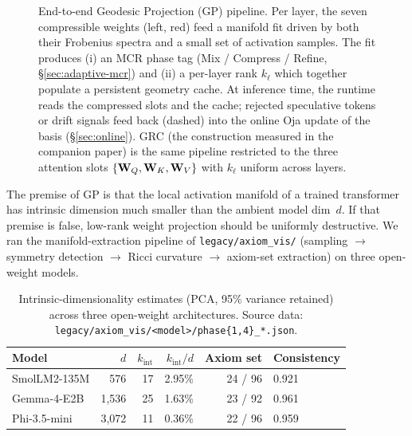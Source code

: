 \documentclass[11pt]{article}
\begin{document}
\begin{figure}[h]
\caption{End-to-end Geodesic Projection (GP) pipeline.  Per layer, the
seven compressible weights (left, red) feed a manifold fit driven by
both their Frobenius spectra and a small set of activation samples.  The
fit produces (i) an MCR phase tag (Mix / Compress / Refine,
\S\ref{sec:adaptive-mcr}) and (ii) a per-layer rank $k_\ell$ which together
populate a persistent geometry cache.  At inference time, the runtime
reads the compressed slots and the cache; rejected speculative tokens or
drift signals feed back (dashed) into the online Oja update of the basis
(\S\ref{sec:online}).  GRC (the construction measured in the companion paper)
is the same pipeline restricted to the three attention slots
$\{\mathbf{W}_Q,\mathbf{W}_K,\mathbf{W}_V\}$ with $k_\ell$ uniform across layers.}
\label{fig:gp-pipeline}
\end{figure}

\noindent The premise of GP is that the local activation manifold of a trained
transformer has intrinsic dimension much smaller than the ambient model
dim~$d$.  If that premise is false, low-rank weight projection should be
uniformly destructive.  We ran the manifold-extraction pipeline of
\texttt{legacy/axiom\_vis/} (sampling $\to$ symmetry detection $\to$ Ricci
curvature $\to$ axiom-set extraction) on three open-weight models.

\begin{table}[h]\centering\small
\caption{Intrinsic-dimensionality estimates (PCA, 95\% variance retained)
across three open-weight architectures.  Source data:
\texttt{legacy/axiom\_vis/<model>/phase\{1,4\}\_*.json}.}
\begin{tabular}{@{}lrrrrl@{}}
\toprule
Model & $d$ & $k_\text{int}$ & $k_\text{int}/d$ & Axiom set & Consistency \\
\midrule
SmolLM2-135M  & 576   & 17 & 2.95\% & 24 / 96 & 0.921 \\
Gemma-4-E2B   & 1{,}536 & 25 & 1.63\% & 23 / 92 & 0.961 \\
Phi-3.5-mini  & 3{,}072 & 11 & 0.36\% & 22 / 96 & 0.959 \\
\bottomrule
\end{tabular}
\end{table}
\end{document}
